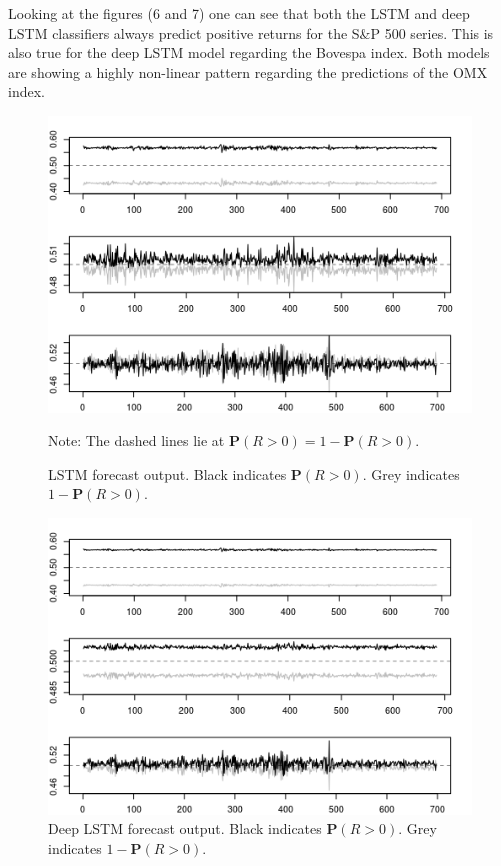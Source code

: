 \documentclass[12pt, letterpaper]{amsart}%
\begin{document}
Looking at the figures (6 and 7) one can see that both the LSTM and deep LSTM classifiers always predict positive returns for the S\&P 500 series. This is also true for the deep LSTM model regarding the Bovespa index. Both models are showing a highly non-linear pattern regarding the predictions of the OMX index.

\begin{figure}%
\caption{LSTM forecast output. Black indicates $\mathbf{P}(R>0)$. Grey indicates $1 - \mathbf{P}(R>0)$.}
\centering
\includegraphics[scale=1]{lstm_prob2.png}
	\begin{tablenotes}
	\item Note: The dashed lines lie at $\mathbf{P}(R>0) = 1 - \mathbf{P}(R>0)$.
	\end{tablenotes}
\end{figure}

\begin{figure}%
\caption{Deep LSTM forecast output. Black indicates $\mathbf{P}(R>0)$. Grey indicates $1 - \mathbf{P}(R>0)$.}
\centering
\includegraphics[scale=1]{lstm_deep_prob2.png}
\end{figure}
\end{document}
